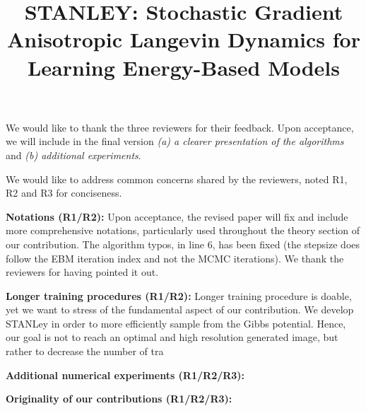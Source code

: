 \documentclass[10pt,twocolumn,letterpaper]{article}
\begin{document}
\title{STANLEY: Stochastic Gradient Anisotropic Langevin Dynamics for Learning Energy-Based Models}  %

\maketitle
\thispagestyle{empty}



We would like to thank the three reviewers for their feedback. 
Upon acceptance, we will include in the final version \emph{{\sf (a)} a clearer presentation of the algorithms} and \emph{{\sf (b)} additional experiments}. 


We would like to address common concerns shared by the reviewers, noted R1, R2 and R3 for conciseness.

\noindent \textbf{Notations (R1/R2):}
Upon acceptance, the revised paper will fix and include more comprehensive notations, particularly used throughout the theory section of our contribution.
The algorithm typos, in line 6, has been fixed (the stepsize does follow the EBM iteration index and not the MCMC iterations). We thank the reviewers for having pointed it out.

\noindent \textbf{Longer training procedures (R1/R2):}
Longer training procedure is doable, yet we want to stress of the fundamental aspect of our contribution. We develop STANLey in order to more efficiently sample from the Gibbs potential. Hence, our goal is not to reach an optimal and high resolution generated image, but rather to decrease the number of tra


\noindent \textbf{Additional numerical experiments (R1/R2/R3):}



\noindent \textbf{Originality of our contributions (R1/R2/R3):}



% 
% 
\end{document}
